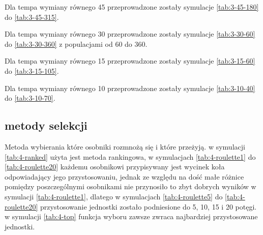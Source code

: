 \documentclass{article}
\newcommand{\inputgraph}[1]{\newpage \newpage} %
\begin{document}
Dla tempa wymiany równego 45 przeprowadzone zostały symulacje \ref{tab:3-45-180}
do \ref{tab:3-45-315}.

\inputgraph{3-45-180.transient.tex}
\inputgraph{3-45-225.transient.tex}
\inputgraph{3-45-270.transient.tex}
\inputgraph{3-45-315.transient.tex}

Dla tempa wymiany równego 30 przeprowadzone zostały symulacje \ref{tab:3-30-60}
do \ref{tab:3-30-360} z populacjami od 60 do 360.

\inputgraph{3-30-60.transient.tex}
\inputgraph{3-30-90.transient.tex}
\inputgraph{3-30-120.transient.tex}
\inputgraph{3-30-150.transient.tex}
\inputgraph{3-30-180.transient.tex}
\inputgraph{3-30-210.transient.tex}
\inputgraph{3-30-240.transient.tex}
\inputgraph{3-30-300.transient.tex}
\inputgraph{3-30-360.transient.tex}

Dla tempa wymiany równego 15 przeprowadzone zostały symulacje \ref{tab:3-15-60}
do \ref{tab:3-15-105}.

\inputgraph{3-15-60.transient.tex}
\inputgraph{3-15-75.transient.tex}
\inputgraph{3-15-90.transient.tex}
\inputgraph{3-15-105.transient.tex}

Dla tempa wymiany równego 10 przeprowadzone zostały symulacje \ref{tab:3-10-40}
do \ref{tab:3-10-70}.

\inputgraph{3-10-40.transient.tex}
\inputgraph{3-10-50.transient.tex}
\inputgraph{3-10-60.transient.tex}
\inputgraph{3-10-70.transient.tex}

\subsection{metody selekcji}
Metoda wybierania które osobniki rozmnożą się i które przeżyją.
w symulacji \ref{tab:4-ranked} użyta jest metoda rankingowa, w symulacjach
\ref{tab:4-roulette1} do \ref{tab:4-roulette20} każdemu osobnikowi przypisywany
jest wycinek koła odpowiadający jego przystosowaniu, jednak ze względu na dość
małe różnice pomiędzy poszczególnymi osobnikami nie przynosiło to zbyt dobrych
wyników w symulacji \ref{tab:4-roulette1}, dlatego w symulacjach
\ref{tab:4-roulette5} do \ref{tab:4-roulette20} przystosowanie jednostki zostało
podniesione do 5, 10, 15 i 20 potęgi. w symulacji \ref{tab:4-top} funkcja wyboru
zawsze zwraca najbardziej przystosowane jednostki.

\inputgraph{4-ranked.transient.tex}
\inputgraph{4-roulette1.transient.tex}
\inputgraph{4-roulette5.transient.tex}
\inputgraph{4-roulette10.transient.tex}
\inputgraph{4-roulette15.transient.tex}
\inputgraph{4-roulette20.transient.tex}
\inputgraph{4-roulette25.transient.tex}
\inputgraph{4-roulette30.transient.tex}
\inputgraph{4-top.transient.tex}
\end{document}
